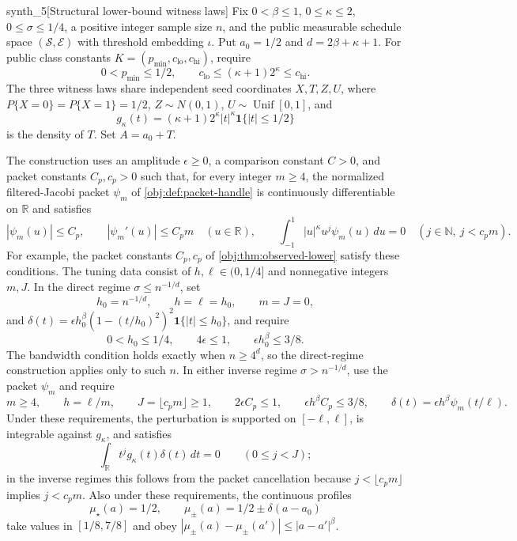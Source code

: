 \documentclass[11pt]{article}
\begin{document}
\begin{definitionv}{synth_5}[Structural lower-bound witness laws]
Fix \(0<\beta\le1\), \(0\le\kappa\le2\), \(0\le\sigma\le1/4\), a positive integer sample size \(n\), and the public measurable schedule space \((\mathcal S,\mathcal E)\) with threshold embedding \(\iota\). Put \(a_0=1/2\) and \(d=2\beta+\kappa+1\). For public class constants \(K=(p_{\min},c_{\mathrm{lo}},c_{\mathrm{hi}})\), require
\[
0<p_{\min}\le1/2,\qquad
c_{\mathrm{lo}}\le(\kappa+1)2^\kappa\le c_{\mathrm{hi}}.
\]
The three witness laws share independent seed coordinates \(X,T,Z,U\), where \(P\{X=0\}=P\{X=1\}=1/2\), \(Z\sim N(0,1)\), \(U\sim\operatorname{Unif}[0,1]\), and
\[
g_\kappa(t)=(\kappa+1)2^\kappa|t|^\kappa\mathbf1\{|t|\le1/2\}
\]
is the density of \(T\). Set \(A=a_0+T\).

The construction uses an amplitude \(\epsilon\ge0\), a comparison constant \(C>0\), and packet constants \(C_p,c_p>0\) such that, for every integer \(m\ge4\), the normalized filtered-Jacobi packet \(\psi_m\) of \cref{obj:def:packet-handle} is continuously differentiable on \(\mathbb R\) and satisfies
\[
|\psi_m(u)|\le C_p,\qquad
|\psi_m'(u)|\le C_pm
\quad(u\in\mathbb R),
\qquad
\int_{-1}^{1}|u|^\kappa u^j\psi_m(u)\,du=0\quad(j\in\mathbb N,\ j<c_pm).
\]
For example, the packet constants \(C_p,c_p\) of \cref{obj:thm:observed-lower} satisfy these conditions. The tuning data consist of \(h,\ell\in(0,1/4]\) and nonnegative integers \(m,J\). In the direct regime \(\sigma\le n^{-1/d}\), set
\[
h_0=n^{-1/d},\qquad h=\ell=h_0,\qquad m=J=0,
\]
and \(\delta(t)=\epsilon h_0^\beta(1-(t/h_0)^2)^2\mathbf1\{|t|\le h_0\}\), and require
\[
0<h_0\le1/4,\qquad 4\epsilon\le1,\qquad \epsilon h_0^\beta\le3/8.
\]
The bandwidth condition holds exactly when \(n\ge4^d\), so the direct-regime construction applies only to such \(n\). In either inverse regime \(\sigma>n^{-1/d}\), use the packet \(\psi_m\) and require
\[
m\ge4,\qquad h=\ell/m,\qquad J=\lfloor c_pm\rfloor\ge1,
\qquad 2\epsilon C_p\le1,\qquad \epsilon h^\beta C_p\le3/8,
\qquad \delta(t)=\epsilon h^\beta\psi_m(t/\ell).
\]
Under these requirements, the perturbation is supported on \([-\ell,\ell]\), is integrable against \(g_\kappa\), and satisfies
\[
\int_{\mathbb R}t^jg_\kappa(t)\delta(t)\,dt=0\qquad(0\le j<J);
\]
in the inverse regimes this follows from the packet cancellation because \(j<\lfloor c_pm\rfloor\) implies \(j<c_pm\). Also under these requirements, the continuous profiles
\[
\mu_\star(a)=1/2,\qquad \mu_\pm(a)=1/2\pm\delta(a-a_0)
\]
take values in \([1/8,7/8]\) and obey \(|\mu_\pm(a)-\mu_\pm(a')|\le|a-a'|^\beta\).


\end{definitionv}
\end{document}
